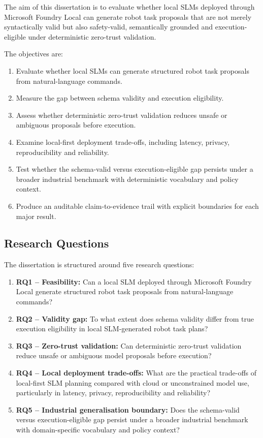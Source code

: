 \documentclass[sigconf,nonacm]{acmart}
\begin{document}
The aim of this dissertation is to evaluate whether local SLMs deployed through Microsoft Foundry Local can generate robot task proposals that are not merely syntactically valid but also safety-valid, semantically grounded and execution-eligible under deterministic zero-trust validation.

The objectives are:
\begin{enumerate}
    \item Evaluate whether local SLMs can generate structured robot task proposals from natural-language commands.
    \item Measure the gap between schema validity and execution eligibility.
    \item Assess whether deterministic zero-trust validation reduces unsafe or ambiguous proposals before execution.
    \item Examine local-first deployment trade-offs, including latency, privacy, reproducibility and reliability.
    \item Test whether the schema-valid versus execution-eligible gap persists under a broader industrial benchmark with deterministic vocabulary and policy context.
    \item Produce an auditable claim-to-evidence trail with explicit boundaries for each major result.
\end{enumerate}

\subsection{Research Questions}
\label{sec:introduction_research_questions}

The dissertation is structured around five research questions:

\begin{enumerate}
    \item \textbf{RQ1 -- Feasibility:} Can a local SLM deployed through Microsoft Foundry Local generate structured robot task proposals from natural-language commands?
    \item \textbf{RQ2 -- Validity gap:} To what extent does schema validity differ from true execution eligibility in local SLM-generated robot task plans?
    \item \textbf{RQ3 -- Zero-trust validation:} Can deterministic zero-trust validation reduce unsafe or ambiguous model proposals before execution?
    \item \textbf{RQ4 -- Local deployment trade-offs:} What are the practical trade-offs of local-first SLM planning compared with cloud or unconstrained model use, particularly in latency, privacy, reproducibility and reliability?
    \item \textbf{RQ5 -- Industrial generalisation boundary:} Does the schema-valid versus execution-eligible gap persist under a broader industrial benchmark with domain-specific vocabulary and policy context?
\end{enumerate}
\end{document}
